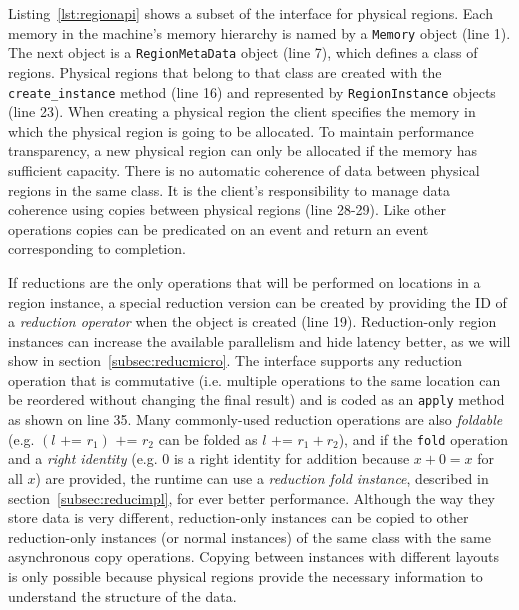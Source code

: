 Listing~\ref{lst:regionapi} shows a subset of the interface for physical regions.  
Each memory in the machine's memory hierarchy is named by a {\tt Memory} object (line 1).
The next object is a {\tt RegionMetaData} object (line 7), which defines a class of
regions.  Physical regions that belong to that class are created with the {\tt create\_instance}
method (line 16) and represented by {\tt RegionInstance} objects (line 23).  When creating a physical
region the client specifies the memory in which the physical region is going
to be allocated.  To maintain performance transparency, a new physical region can only be allocated
if the memory has sufficient capacity.
There is no automatic coherence of data between physical regions in the
same class.  It is the client's responsibility to manage data coherence using copies
between physical regions (line 28-29).  Like other operations copies can be
predicated on an event and return an event corresponding to completion.

If reductions are the only operations that will be performed on locations in a region instance,
a special reduction version can be created by providing the ID of a {\em reduction operator}
when the object is created (line 19).  Reduction-only region instances can 
increase the available parallelism and hide latency better, as we will show in 
section~\ref{subsec:reducmicro}.  The interface supports any reduction operation that
is commutative (i.e. multiple operations to the same location can be reordered without 
changing the final result) and is coded as an {\tt apply} method as shown on line 35.
Many commonly-used reduction operations are also {\em foldable} (e.g. $(l \text{ += } r_1) \text{ += } r_2$ can
be folded as $l \text{ += } r_1 + r_2$), and if the {\tt fold} operation and a {\em right identity}
(e.g. $0$ is a right identity for addition because $x + 0 = x$ for all $x$) are provided,
the runtime can use a {\em reduction fold instance}, described in section~\ref{subsec:reducimpl},
for ever better performance.  Although the way they store data is very different,
reduction-only instances can be copied to other reduction-only instances (or normal 
instances) of the same class with the same asynchronous copy operations.  Copying between
instances with different layouts is only possible because physical regions provide 
the necessary information to understand the structure of the data.

